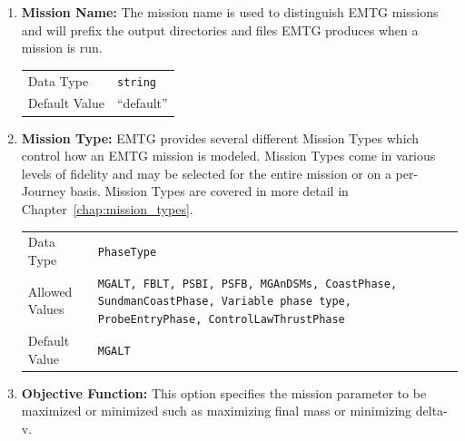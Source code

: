 \begin{enumerate}

    \item \textbf{Mission Name:} The mission name is used to distinguish \ac{EMTG} missions and will prefix the output directories and files \ac{EMTG} produces when a mission is run.

        \begin{table}[H]
            \hspace{2cm}
            \begin{tabular}{ll}
            Data Type & \verb|string| \\
            Default Value & ``default'' \\
            \end{tabular}
        \end{table}

    \item \textbf{Mission Type:} \ac{EMTG} provides several different Mission Types which control how an \ac{EMTG} mission is modeled. Mission Types come in various levels of fidelity and may be selected for the entire mission or on a per-Journey basis. Mission Types are covered in more detail in Chapter~\ref{chap:mission_types}.
        \begin{table}[H]
            \hspace{2cm}
            \begin{tabular}{lp{3cm}}
            Data Type & \verb|PhaseType| \\
            Allowed Values & \verb|MGALT, FBLT, PSBI, PSFB, MGAnDSMs, CoastPhase,| \newline
                             \verb|SundmanCoastPhase, Variable phase type,| \newline
                             \verb|ProbeEntryPhase, ControlLawThrustPhase| \\
            Default Value & \verb|MGALT| \\
            \end{tabular}
        \end{table}

    \item \textbf{Objective Function:} This option specifies the mission parameter to be maximized or minimized such as maximizing final mass or minimizing delta-v.
    

\end{enumerate}
